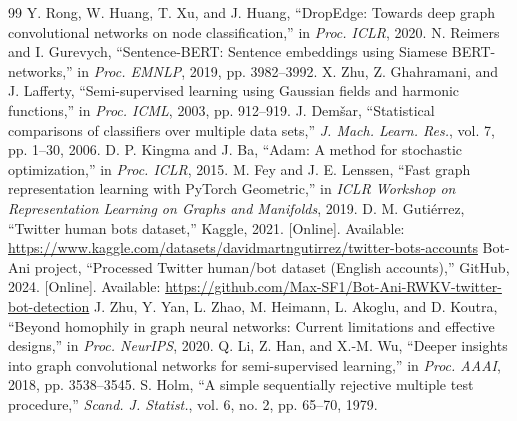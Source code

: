 \documentclass[conference]{IEEEtran}
\begin{document}
\begin{thebibliography}{99}
 Y. Rong, W. Huang, T. Xu, and J. Huang, ``DropEdge: Towards deep graph convolutional networks on node classification,'' in \emph{Proc. ICLR}, 2020.
 N. Reimers and I. Gurevych, ``Sentence-BERT: Sentence embeddings using Siamese BERT-networks,'' in \emph{Proc. EMNLP}, 2019, pp. 3982--3992.
 X. Zhu, Z. Ghahramani, and J. Lafferty, ``Semi-supervised learning using Gaussian fields and harmonic functions,'' in \emph{Proc. ICML}, 2003, pp. 912--919.
 J. Dem\v{s}ar, ``Statistical comparisons of classifiers over multiple data sets,'' \emph{J. Mach. Learn. Res.}, vol. 7, pp. 1--30, 2006.
 D. P. Kingma and J. Ba, ``Adam: A method for stochastic optimization,'' in \emph{Proc. ICLR}, 2015.
 M. Fey and J. E. Lenssen, ``Fast graph representation learning with PyTorch Geometric,'' in \emph{ICLR Workshop on Representation Learning on Graphs and Manifolds}, 2019.
 D. M. Guti\'errez, ``Twitter human bots dataset,'' Kaggle, 2021. [Online]. Available: \url{https://www.kaggle.com/datasets/davidmartngutirrez/twitter-bots-accounts}
 Bot-Ani project, ``Processed Twitter human/bot dataset (English accounts),'' GitHub, 2024. [Online]. Available: \url{https://github.com/Max-SF1/Bot-Ani-RWKV-twitter-bot-detection}
 J. Zhu, Y. Yan, L. Zhao, M. Heimann, L. Akoglu, and D. Koutra, ``Beyond homophily in graph neural networks: Current limitations and effective designs,'' in \emph{Proc. NeurIPS}, 2020.
 Q. Li, Z. Han, and X.-M. Wu, ``Deeper insights into graph convolutional networks for semi-supervised learning,'' in \emph{Proc. AAAI}, 2018, pp. 3538--3545.
 S. Holm, ``A simple sequentially rejective multiple test procedure,'' \emph{Scand. J. Statist.}, vol. 6, no. 2, pp. 65--70, 1979.
\end{thebibliography}
\end{document}
